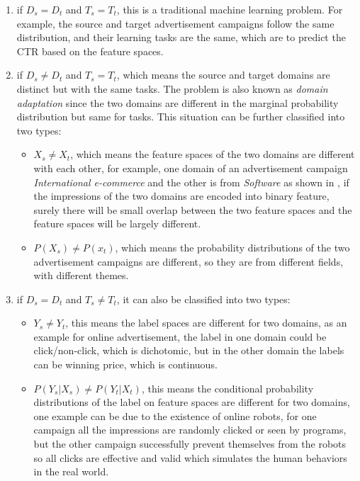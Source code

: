 \begin{enumerate}
\item if \(D_s = D_t\) and \(T_s = T_t\), this is a traditional machine learning problem. For example, the source and target advertisement campaigns follow the same distribution, and their learning tasks are the same, which are to predict the CTR based on the feature spaces. 

\item if  \(D_s \neq D_t\) and \(T_s = T_t\), which means the source and target domains are distinct but with the same tasks. The problem is also known as \textit{domain adaptation} \cite{arnold2007comparative} since the two domains are different in the marginal probability distribution but same for tasks. This situation can be further classified into two types:
    \begin{itemize}
    \item  \(X_s \neq X_t\), which means the feature spaces of the two domains are different with each other, for example, one domain of an advertisement campaign  \textit{International e-commerce} and the other is from \textit{ Software} as shown in \cite{zhang2014real}, if the impressions of the two domains are encoded into binary feature, surely there will be small overlap between the two feature spaces and the feature spaces will be largely different.
    \item \(P(X_s) \neq P(x_t) \), which means the probability distributions of the two advertisement campaigns are different, so they are from different fields, with different themes. 
    
    \end{itemize}
\item if  \(D_s = D_t\) and \(T_s \neq T_t\), it can also be classified into two types:
     \begin{itemize}
    \item  \(Y_s \neq Y_t\), this means the label spaces are different for two domains, as an example for online advertisement, the label in one domain could be click/non-click, which is dichotomic, but in the other domain the labels can be winning price, which is continuous.
    \item \(P(Y_s|X_s) \neq P(Y_t|X_t) \), this means the conditional probability distributions of the label on feature spaces are different for two domains, one example can be due to the existence of online robots, for one campaign all the impressions are randomly clicked or seen by programs, but the other campaign successfully prevent themselves from the robots so all clicks are effective and valid which simulates the human behaviors in the real world.  
  \end{itemize}
\end{enumerate}

